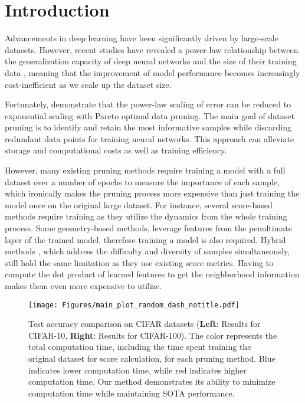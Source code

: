  \section{Introduction}

Advancements in deep learning have been significantly driven by large-scale datasets. However, recent studies have revealed a power-law relationship between the generalization capacity of deep neural networks and the size of their training data \citep{hestness2017deep, rosenfeld2019constructive, gordon2021data}, meaning that the improvement of model performance becomes increasingly cost-inefficient as we scale up the dataset size.

Fortunately, \citet{sorscher2022beyond} demonstrate that the power-law scaling of error can be reduced to exponential scaling with Pareto optimal data pruning. The main goal of dataset pruning is to identify and retain the most informative samples while discarding redundant data points for training neural networks. This approach can alleviate storage and computational costs as well as training efficiency.

However, many existing pruning methods require training a model with a full dataset over a number of epochs to measure the importance of each sample, which ironically makes the pruning process more expensive than just training the model once on the original large dataset. 
For instance, several score-based methods \citep{toneva2018empirical, pleiss2020identifyingmislabeleddatausing, gordon2021data, he2024large, zhang2024spanning} require training as they utilize the dynamics from the whole training process. Some geometry-based methods, \citep{xia2022moderate, yang2024mind} leverage features from the penultimate layer of the trained model, therefore training a model is also required.
Hybrid methods \citep{zheng2022coverage, maharana2023d2, tan2025data}, which address the difficulty and diversity of samples simultaneously, still hold the same limitation as they use existing score metrics. Having to compute the dot product of learned features to get the neighborhood information makes them even more expensive to utilize.

\begin{figure*}[t]
    \raggedleft
    \texttt{[image: Figures/main\_plot\_random\_dash\_notitle.pdf]}
    \caption{Test accuracy comparison on CIFAR datasets (\textbf{Left}: Results for CIFAR-10, \textbf{Right}: Results for CIFAR-100). The color represents the total computation time, including the time spent training the original dataset for score calculation, for each pruning method. Blue indicates lower computation time, while red indicates higher computation time. Our method demonstrates its ability to minimize computation time while maintaining SOTA performance.}
    \label{fig:main_figure_cifar10_100}
\end{figure*}

